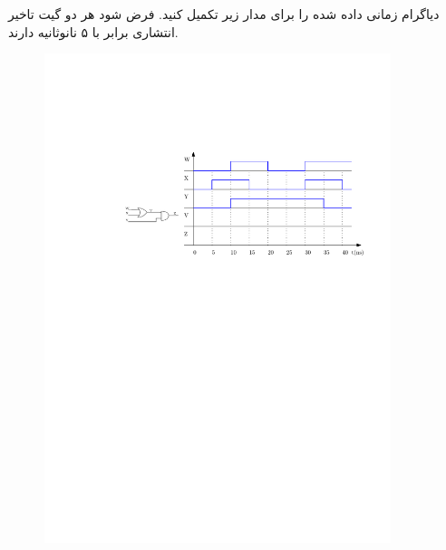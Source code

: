 
دیاگرام زمانی داده ‌شده را برای مدار زیر تکمیل کنید. فرض شود هر دو گیت تاخیر انتشاری برابر با ۵ نانوثانیه دارند.


\begin{figure}[h]
	\centering
	\includegraphics[width=0.9\textwidth]{fig/Q5.pdf}
	\label{fig:Q5}
\end{figure}

